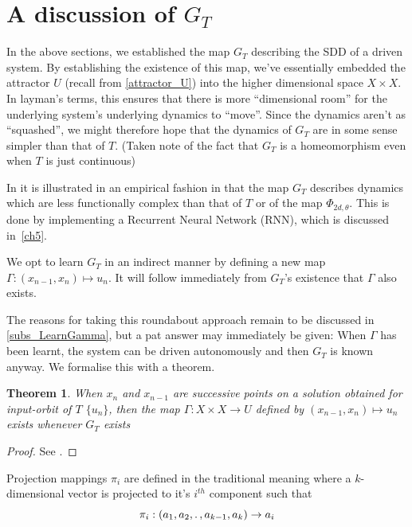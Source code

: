 \documentclass[a4paper,12pt,twoside]{report}
\newtheorem{Definition}{Definition}[]
\newtheorem{Theorem}{Theorem}[]
\begin{document}
\section{A discussion of $G_T$ }

In the above sections, we established the map $G_T$ describing the SDD of a driven system. By establishing the existence of this map, we’ve essentially embedded the attractor $U$ (recall from \ref{attractor_U}) into the higher dimensional space $X\times{X}$.
In layman’s terms, this ensures that there is more “dimensional room” for the underlying system’s underlying dynamics to “move”. Since the dynamics aren’t as “squashed”, we might therefore hope that the dynamics of $G_T$ are in some sense simpler than that of $T$. (Taken note of the fact that $G_T$ is a homeomorphism even when $T$ is just continuous)
 
In \cite{manjunath2021universal} it is illustrated in an empirical fashion in that the map $G_T$ describes dynamics which are less functionally complex than that of $T$ or of the map $\Phi_{2d,\theta}$. This is done by implementing a Recurrent Neural Network (RNN), which is discussed in~\ref{ch5}. 
 
We opt to learn $G_T$ in an indirect manner by defining a new map $\Gamma:(x_{n-1},x_n)\mapsto{u_n}$. It will follow immediately from $G_T$’s existence that $\Gamma$ also exists. 

The reasons for taking this roundabout approach remain to be discussed in \ref{subs_LearnGamma}, but a pat answer may immediately be given: When $\Gamma$ has been learnt, the system can be driven autonomously and then $G_T$ is known anyway. We formalise this with a theorem.

\begin{Theorem}
  When $x_n$ and $x_{n-1}$ are successive points on a solution obtained for input-orbit of $T$ $\{u_n\}$, then the map $\Gamma: X\times{X}\to{U}$ defined by $(x_{n-1},x_n)\mapsto{u_n}$ exists whenever $G_T$ exists 
\end{Theorem}
\begin{proof}
  See \cite[Th. 3c]{manjunath2021universal}.
\end{proof}

Projection mappings $\pi_i$ are defined in the traditional meaning where a $k$-dimensional vector is projected to it's $i^{th}$ component such that $$\pi_i:(a_1,a_2, \ldotp, a_{k-1}, a_k)\to{a_i}$$

\end{document}
